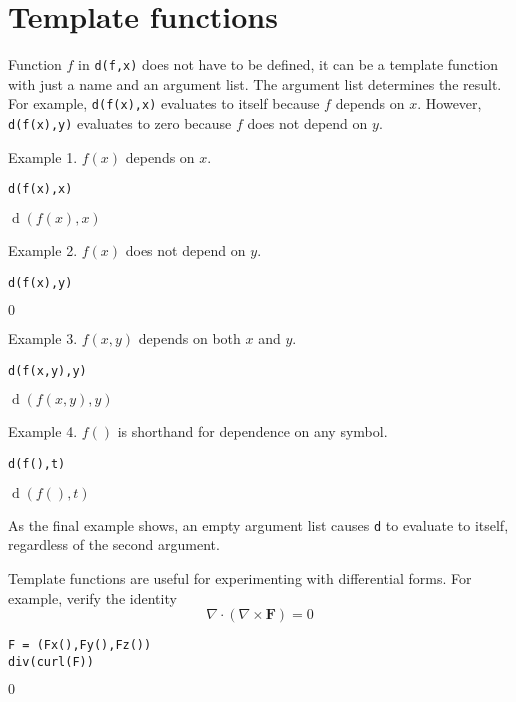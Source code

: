 \documentclass[12pt]{article}
\begin{document}
\section*{Template functions}

Function $f$ in \verb$d(f,x)$ does not have to be defined,
it can be a template function with just a name and an argument list.
The argument list determines the result.
For example, \verb$d(f(x),x)$ evaluates to itself because $f$ depends on $x$.
However, \verb$d(f(x),y)$ evaluates to zero because $f$ does not depend on $y$.

\bigskip
Example 1. $f(x)$ depends on $x$.
%
{\color{blue}
\begin{verbatim}
d(f(x),x)
\end{verbatim}}
%
$\operatorname{d}(f(x),x)$

\bigskip
Example 2. $f(x)$ does not depend on $y$.
%
{\color{blue}
\begin{verbatim}
d(f(x),y)
\end{verbatim}}
%
$0$

\bigskip
Example 3. $f(x,y)$ depends on both $x$ and $y$.
%
{\color{blue}
\begin{verbatim}
d(f(x,y),y)
\end{verbatim}}
%
$\operatorname{d}(f(x,y),y)$

\bigskip
Example 4. $f()$ is shorthand for dependence on any symbol.
%
{\color{blue}
\begin{verbatim}
d(f(),t)
\end{verbatim}}
%
$\operatorname{d}(f(),t)$

\bigskip
As the final example shows, an empty argument list causes
\verb$d$ to evaluate to itself, regardless
of the second argument.

\bigskip
Template functions are useful for experimenting with differential forms.
For example, verify the identity
%
\begin{equation*}
\nabla\cdot(\nabla\times\mathbf F)=0
\end{equation*}
%
{\color{blue}
\begin{verbatim}
F = (Fx(),Fy(),Fz())
div(curl(F))
\end{verbatim}}
%
$0$
\end{document}
